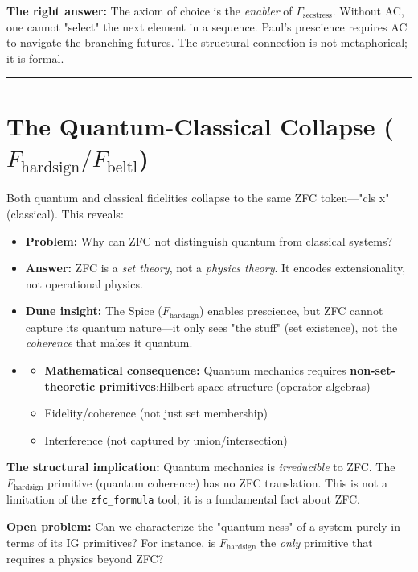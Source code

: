 \documentclass[12pt,a4paper]{article}
\begin{document}
\textbf{The right answer:} The axiom of choice is the \emph{enabler} of $\Gamma_{\text{secstress}}$. Without AC, one cannot "select" the next element in a sequence. Paul's prescience requires AC to navigate the branching futures. The structural connection is not metaphorical; it is formal.

\begin{center}
\rule{0.5\textwidth}{0.4pt}
\end{center}

\section{The Quantum-Classical Collapse ($F_{\text{hardsign}}/F_{\text{beltl}}$)}

Both quantum and classical fidelities collapse to the same ZFC token---"cls x" (classical). This reveals:

\begin{itemize}
    \item \textbf{Problem:} Why can ZFC not distinguish quantum from classical systems?
    \item \textbf{Answer:} ZFC is a \emph{set theory}, not a \emph{physics theory}. It encodes extensionality, not operational physics.
    \item \textbf{Dune insight:} The Spice ($F_{\text{hardsign}}$) enables prescience, but ZFC cannot capture its quantum nature---it only sees "the stuff" (set existence), not the \emph{coherence} that makes it quantum.
    \item 
    \begin{itemize}
    \item \textbf{Mathematical consequence:} Quantum mechanics requires \textbf{non-set-theoretic primitives}:Hilbert space structure (operator algebras)
    \item Fidelity/coherence (not just set membership)
    \item Interference (not captured by union/intersection)
\end{itemize}

\end{itemize}

\textbf{The structural implication:} Quantum mechanics is \emph{irreducible} to ZFC. The $F_{\text{hardsign}}$ primitive (quantum coherence) has no ZFC translation. This is not a limitation of the \texttt{zfc\_formula} tool; it is a fundamental fact about ZFC.

\textbf{Open problem:} Can we characterize the "quantum-ness" of a system purely in terms of its IG primitives? For instance, is $F_{\text{hardsign}}$ the \emph{only} primitive that requires a physics beyond ZFC?
\end{document}
